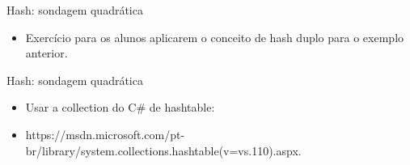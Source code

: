 \begin{frame}
	\begin{block}{Hash: sondagem quadrática}
		\begin{itemize}
			\item Exercício para os alunos aplicarem o conceito de hash duplo para o exemplo anterior.
		\end{itemize}
	\end{block}
\end{frame}

\begin{frame}
	\begin{block}{Hash: sondagem quadrática}
		\begin{itemize}
			\item Usar a collection do C\# de hashtable:

			\item https://msdn.microsoft.com/pt-br/library/system.collections.hashtable(v=vs.110).aspx.
		\end{itemize}
	\end{block}
\end{frame}
 